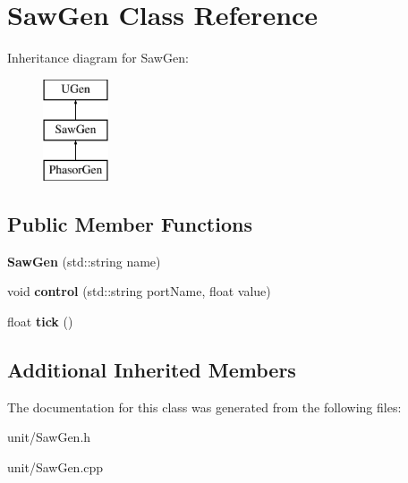 \hypertarget{classSawGen}{}\section{Saw\+Gen Class Reference}
\label{classSawGen}
Inheritance diagram for Saw\+Gen\+:\begin{figure}[H]
\begin{center}
\leavevmode
\includegraphics[height=3.000000cm]{classSawGen}
\end{center}
\end{figure}
\subsection*{Public Member Functions}
\begin{DoxyCompactItemize}
\item 
{\bfseries Saw\+Gen} (std\+::string name)\hypertarget{classSawGen_a24c35afc1bdb237a8a5d1eb3888ce0bc}{}\label{classSawGen_a24c35afc1bdb237a8a5d1eb3888ce0bc}

\item 
void {\bfseries control} (std\+::string port\+Name, float value)\hypertarget{classSawGen_a515f6eb82a1a97ee434144b8c58133b8}{}\label{classSawGen_a515f6eb82a1a97ee434144b8c58133b8}

\item 
float {\bfseries tick} ()\hypertarget{classSawGen_a18c6704aec8f20a5605ff72d674c7516}{}\label{classSawGen_a18c6704aec8f20a5605ff72d674c7516}

\end{DoxyCompactItemize}
\subsection*{Additional Inherited Members}


The documentation for this class was generated from the following files\+:\begin{DoxyCompactItemize}
\item 
unit/Saw\+Gen.\+h\item 
unit/Saw\+Gen.\+cpp\end{DoxyCompactItemize}
